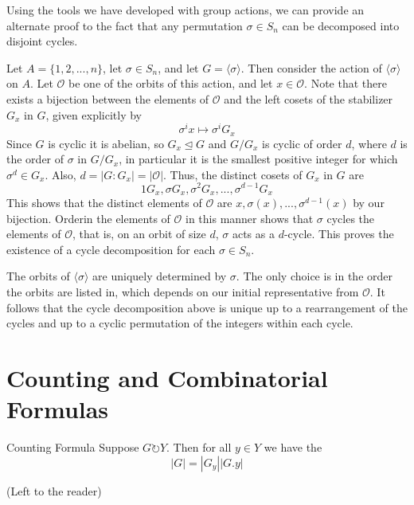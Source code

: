 \documentclass[12pt, a4paper, twoside, openright, titlepage]{book}
\begin{document}
Using the tools we have developed with group actions, we can provide an alternate proof to the fact that any permutation $\sigma \in S_n$ can be decomposed into disjoint cycles.

\begin{proof*}{}{}
    Let $A = \{1,2,...,n\}$, let $\sigma \in S_n$, and let $G =\langle \sigma \rangle$. Then consider the action of $\langle \sigma \rangle$ on $A$. Let $\mathcal{O}$ be one of the orbits of this action, and let $x \in \mathcal{O}$. Note that there exists a bijection between the elements of $\mathcal{O}$ and the left cosets of the stabilizer $G_x$ in $G$, given explicitly by \begin{equation*}
        \sigma^ix\mapsto \sigma^iG_x
    \end{equation*}
    Since $G$ is cyclic it is abelian, so $G_x \trianglelefteq G$ and $G/G_x$ is cyclic of order $d$, where $d$ is the order of $\sigma$ in $G/G_x$, in particular it is the smallest positive integer for which $\sigma^d \in G_x$. Also, $d = |G:G_x| = |\mathcal{O}|$. Thus, the distinct cosets of $G_x$ in $G$ are \begin{equation*}
        1G_x,\sigma G_x,\sigma^2G_x,...,\sigma^{d-1}G_x
    \end{equation*}
    This shows that the distinct elements of $\mathcal{O}$ are $x,\sigma(x),...,\sigma^{d-1}(x)$ by our bijection. Orderin the elements of $\mathcal{O}$ in this manner shows that $\sigma$ cycles the elements of $\mathcal{O}$, that is, on an orbit of size $d$, $\sigma$ acts as a $d$-cycle. This proves the existence of a cycle decomposition for each $\sigma \in S_n$.


    The orbits of $\langle \sigma \rangle$ are uniquely determined by $\sigma$. The only choice is in the order the orbits are listed in, which depends on our initial representative from $\mathcal{O}$. It follows that the cycle decomposition above is unique up to a rearrangement of the cycles and up to a cyclic permutation of the integers within each cycle.
\end{proof*}


\section{\textsection Counting and Combinatorial Formulas}


\begin{namthm}{Counting Formula}{}
        Suppose $G \circlearrowright Y$. Then for all $y \in Y$ we have the  \begin{equation}
                |G| = |G_y||G.y|
        \end{equation}
\end{namthm}
\begin{proof*}{}{}
        (Left to the reader)
\end{proof*}
\end{document}
